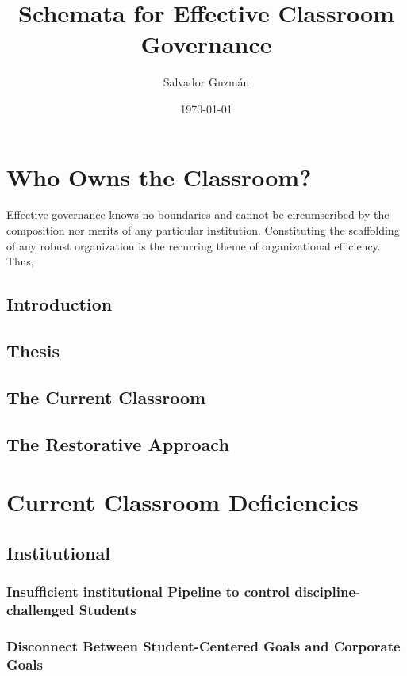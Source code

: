 \documentclass[12pt]{article}
\author{Salvador Guzm\'{a}n}
\date{\today}
\title{Schemata for Effective Classroom Governance}
\begin{document}
	\maketitle
	\pagebreak
	\tableofcontents
	\pagebreak

	\section{Who Owns the Classroom?}
	Effective governance knows no boundaries and cannot be circumscribed by the composition nor merits of any particular institution. Constituting the scaffolding of any robust organization is the recurring theme of organizational efficiency.  Thus, 
	\subsection{Introduction}
	\subsection{Thesis}
	\subsection{The Current Classroom}
	\subsection{The Restorative Approach}
	
	\section{Current Classroom Deficiencies}
	
	\subsection{Institutional}
	\subsubsection{Insufficient institutional Pipeline to control discipline-challenged Students}
	\subsubsection{Disconnect Between Student-Centered Goals and Corporate Goals}
\end{document}
